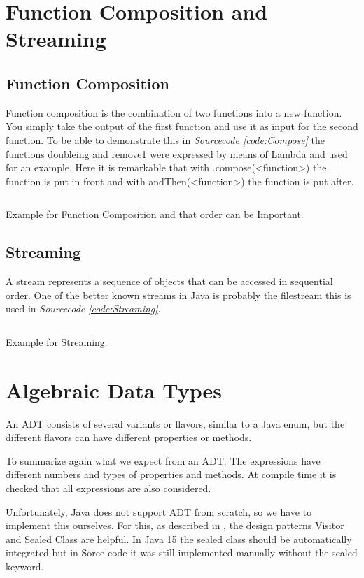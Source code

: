 \documentclass[a4paper,12pt,twoside]{scrreprt}
\begin{document}
\section{Function Composition and Streaming}
\subsection{Function Composition}
Function composition is the combination of two functions into a new function. You simply take the output of the first function and use it as input for the second function. To be able to demonstrate this in \emph{Sourcecode \ref{code:Compose}} the functions doubleing and remove1 were expressed by means of Lambda and used for an example. Here it is remarkable that with .compose(<function>) the function is put in front and with andThen(<function>) the function is put after.
\begin{listing}[ht]
    \inputminted[fontsize=\footnotesize,linenos,breaklines]{java}{./code/FunctionComposition.java}
    \caption[Example for Function Composition]{Example for Function Composition and that order can be Important.}
    \label{code:Compose}
\end{listing}
\clearpage

\subsection{Streaming}
A stream represents a sequence of objects that can be accessed in sequential order.
One of the better known streams in Java is probably the filestream this is used in \emph{Sourcecode \ref{code:Streaming}}.
\begin{listing}[ht]
    \inputminted[fontsize=\footnotesize,linenos]{java}{./code/Streaming.java}
    \caption[Example for Streaming]{Example for Streaming.}
    \label{code:Streaming}
\end{listing}
\clearpage
\section{Algebraic Data Types}
An \ac{ADT} consists of several variants or flavors, similar to a Java enum, but the different flavors can have different properties or methods.

To summarize again what we expect from an \ac{ADT}:
The expressions have different numbers and types of properties and methods.
At compile time it is checked that all expressions are also considered.

Unfortunately, Java does not support ADT from scratch, so we have to implement this ourselves. For this, as described in \cite{MAINIERO_algebraic_2020}, the design patterns Visitor and Sealed Class are helpful. In Java 15 the sealed class should be automatically integrated but in Sorce code it was still implemented manually without the sealed keyword.
\end{document}
